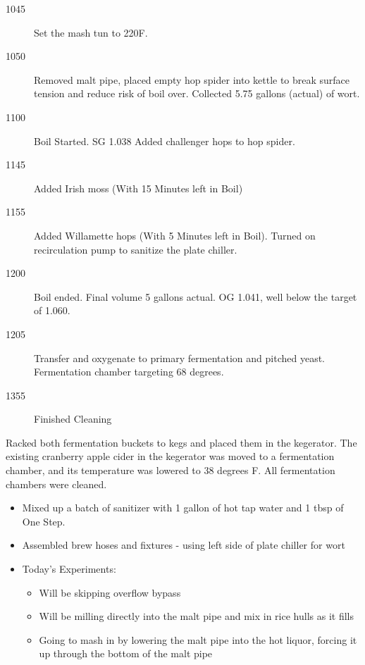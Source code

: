 \begin{description}
    \item[1045] Set the mash tun to 220F.
    \item[1050] Removed malt pipe, placed empty hop spider into kettle to break surface tension and reduce risk of boil over.  Collected 5.75 gallons (actual) of wort.
    \item[1100] Boil Started. SG 1.038 Added challenger hops to hop spider.
    \item[1145] Added Irish moss (With 15 Minutes left in Boil)
    \item[1155] Added Willamette hops (With 5 Minutes left in Boil).  Turned on recirculation pump to sanitize the plate chiller.
    \item[1200] Boil ended. Final volume 5 gallons actual. OG 1.041, well below the target of 1.060.
    \item[1205] Transfer and oxygenate to primary fermentation and pitched yeast.  Fermentation chamber targeting 68 degrees.
    \item[1355] Finished Cleaning
\end{description}

\def\todaysdate{20210801}
\newday{\todaysdate}\label{\todaysdate}


Racked both fermentation buckets to kegs and placed them in the kegerator.  The existing cranberry apple cider in the kegerator was moved to a fermentation chamber, and its temperature was lowered to 38 degrees F.  All fermentation chambers were cleaned.

\def\todaysdate{20211015}
\newday{\todaysdate}\label{\todaysdate}


\begin{itemize}
    \item Mixed up a batch of sanitizer with 1 gallon of hot tap water and 1 tbsp of One Step.
    \item Assembled brew hoses and fixtures - using left side of plate chiller for wort
    \item Today's Experiments:
        \begin{itemize}
            \item Will be skipping overflow bypass
            \item Will be milling directly into the malt pipe and mix in rice hulls as it fills
            \item Going to mash in by lowering the malt pipe into the hot liquor, forcing it up through the bottom of the malt pipe
        \end{itemize}
\end{itemize}

